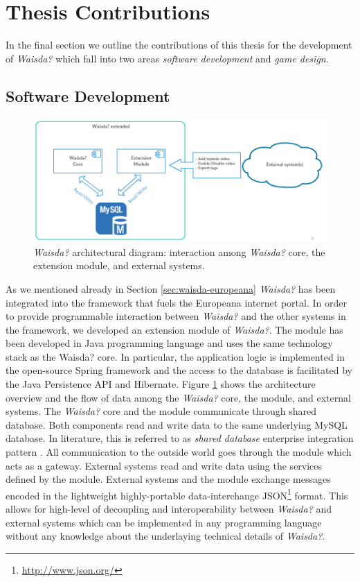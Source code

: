 \section{Thesis Contributions} 
In the final section we outline the contributions of this thesis for the development of \textit{Waisda?} which fall into two areas \textit{software development} and \textit{game design}.
\subsection{Software Development}\label{chap:waisda:thesis-soft}

\begin{figure}[t!]
\centering
\includegraphics[width=\columnwidth]{waisda-diagram} 
\caption{\textit{Waisda?} architectural diagram: interaction among \textit{Waisda?} core, the extension module, and external systems.}
\label{waisda-diagram}
\end{figure}

As we mentioned already in Section \ref{sec:waisda-europeana} \textit{Waisda?} has been integrated into the framework that fuels the Europeana internet portal. In order to provide programmable interaction between \textit{Waisda?} and the other systems in the framework, we developed an extension module of \textit{Waisda?}. The module has been developed in Java programming language and uses the same technology stack as the Waisda? core. In particular, the application logic is implemented in the open-source Spring framework and the access to the database is facilitated by the Java Persistence API and Hibernate. Figure \ref{waisda-diagram} shows the architecture overview and the flow of data among the \textit{Waisda?} core, the module, and external systems. The \textit{Waisda?} core and the module communicate through shared database. Both components read and write data to the same underlying MySQL database. In literature, this is referred to as \textit{shared database} enterprise integration pattern \cite{Hohpe:2003:EIP:940308}. All communication to the outside world goes through the module which acts as a gateway. External systems read and write data using the services defined by the module. External systems and the module exchange messages encoded in the lightweight highly-portable data-interchange JSON\footnote{\url{http://www.json.org/}} format. This allows for high-level of decoupling and interoperability between \textit{Waisda?} and external systems which can be implemented in any programming language without any knowledge about the underlaying technical details of \textit{Waisda?}.

